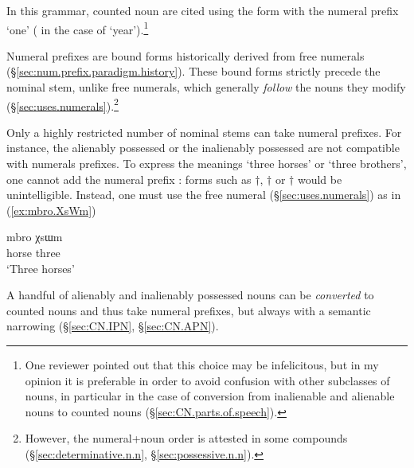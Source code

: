 In this grammar, counted noun are cited using the form with the numeral prefix `one' ( in the case of `year').\footnote{One reviewer pointed out that this choice may be infelicitous, but in my opinion it is preferable in order to avoid confusion with other subclasses of nouns, in particular in the case of conversion from inalienable and alienable nouns to counted nouns (§\ref{sec:CN.parts.of.speech}). }

Numeral prefixes are bound forms historically derived from free numerals (§\ref{sec:num.prefix.paradigm.history}). These bound forms strictly precede the nominal stem, unlike free numerals, which generally \textit{follow} the nouns they modify  (§\ref{sec:uses.numerals}).\footnote{However, the numeral+noun order is attested in some compounds (§\ref{sec:determinative.n.n}, §\ref{sec:possessive.n.n}). }

Only a highly restricted number of nominal stems can take numeral prefixes. For instance, the alienably possessed  or the inalienably possessed  are not compatible with numerals prefixes. To express the meanings `three horses' or `three brothers', one cannot add the numeral prefix : forms such as $\dagger$, $\dagger$ or $\dagger$ would be unintelligible. Instead, one must use the free numeral  (§\ref{sec:uses.numerals}) as in (\ref{ex:mbro.XsWm}) 

\begin{exe}
\ex \label{ex:mbro.XsWm}
\gll mbro χsɯm \\
horse three \\
\glt `Three horses'
\end{exe}

A handful of alienably and inalienably possessed nouns can be \textit{converted} to counted nouns and thus take numeral prefixes, but always with a semantic narrowing (§\ref{sec:CN.IPN}, §\ref{sec:CN.APN}).

